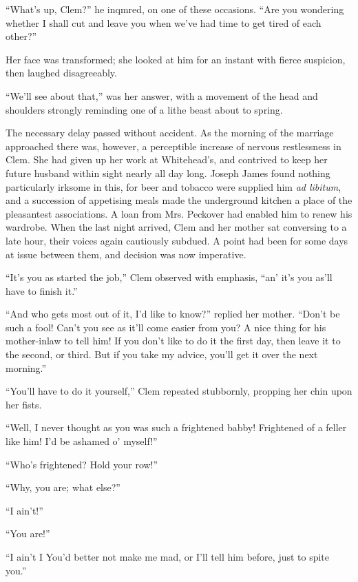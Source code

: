 ``What's up, Clem?'' he inqmred, on one of these occasions. ``Are you
wondering whether I shall cut and leave you when we've had time to get
tired of each other?''

Her face was transformed; she looked at him for an instant with fierce
suspicion, then laughed disagreeably.

``We'll see about that,'' was her answer, with a movement of the head
and shoulders strongly reminding one of a lithe beast about to spring.

The necessary delay passed without accident. As the morning of the
marriage approached there was, however, a perceptible increase of
nervous restlessness in Clem. She had given up her work at Whitehead's,
and contrived to keep her future husband within sight nearly all day
long. Joseph James found nothing particularly irksome in this, for beer
and tobacco were supplied him \emph{ad libitum}, and a succession of
appetising {\protect\hypertarget{63}{}{}}meals made the underground
kitchen a place of the pleasantest associations. A loan from Mrs.
Peckover had enabled him to renew his wardrobe. When the last night
arrived, Clem and her mother sat conversing to a late hour, their voices
again cautiously subdued. A point had been for some days at issue
between them, and decision was now imperative.

``It's you as started the job,'' Clem observed with emphasis, ``an' it's
you as'll have to finish it.''

``And who gets most out of it, I'd like to know?'' replied her mother.
``Don't be such a fool! Can't you see as it'll come easier from you? A
nice thing for his mother-inlaw to tell him! If you don't like to do it
the first day, then leave it to the second, or third. But if you take my
advice, you'll get it over the next morning.''

``You'll have to do it yourself,'' Clem repeated stubbornly, propping
her chin upon her fists.

``Well, I never thought as you was such a
{\protect\hypertarget{64}{}{}}frightened babby! Frightened of a feller
like him! I'd be ashamed o' myself!''

``Who's frightened? Hold your row!''

``Why, you are; what else?''

``I ain't!''

``You are!''

``I ain't I You'd better not make me mad, or I'll tell him before, just
to spite you.''

